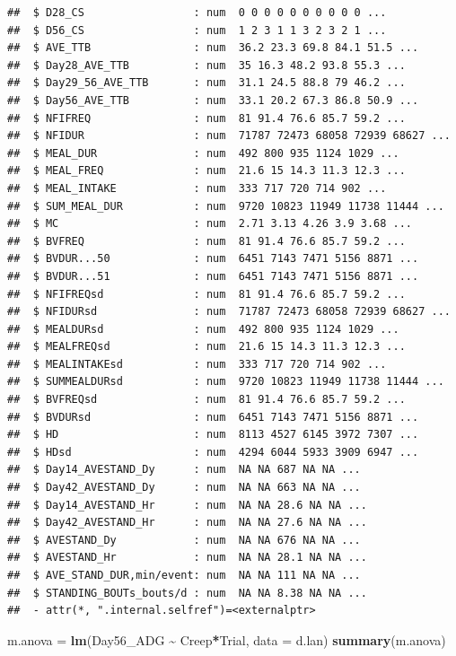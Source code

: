 \documentclass[
]{book}
\newenvironment{Shaded}{\begin{snugshade}}{\end{snugshade}}
\newcommand{\AttributeTok}[1]{\textcolor[rgb]{0.13,0.29,0.53}{#1}}
\newcommand{\FunctionTok}[1]{\textcolor[rgb]{0.13,0.29,0.53}{\textbf{#1}}}
\newcommand{\NormalTok}[1]{#1}
\newcommand{\OtherTok}[1]{\textcolor[rgb]{0.56,0.35,0.01}{#1}}
\newcommand{\SpecialCharTok}[1]{\textcolor[rgb]{0.81,0.36,0.00}{\textbf{#1}}}
\begin{document}
\begin{verbatim}
##  $ D28_CS                 : num  0 0 0 0 0 0 0 0 0 0 ...
##  $ D56_CS                 : num  1 2 3 1 1 3 2 3 2 1 ...
##  $ AVE_TTB                : num  36.2 23.3 69.8 84.1 51.5 ...
##  $ Day28_AVE_TTB          : num  35 16.3 48.2 93.8 55.3 ...
##  $ Day29_56_AVE_TTB       : num  31.1 24.5 88.8 79 46.2 ...
##  $ Day56_AVE_TTB          : num  33.1 20.2 67.3 86.8 50.9 ...
##  $ NFIFREQ                : num  81 91.4 76.6 85.7 59.2 ...
##  $ NFIDUR                 : num  71787 72473 68058 72939 68627 ...
##  $ MEAL_DUR               : num  492 800 935 1124 1029 ...
##  $ MEAL_FREQ              : num  21.6 15 14.3 11.3 12.3 ...
##  $ MEAL_INTAKE            : num  333 717 720 714 902 ...
##  $ SUM_MEAL_DUR           : num  9720 10823 11949 11738 11444 ...
##  $ MC                     : num  2.71 3.13 4.26 3.9 3.68 ...
##  $ BVFREQ                 : num  81 91.4 76.6 85.7 59.2 ...
##  $ BVDUR...50             : num  6451 7143 7471 5156 8871 ...
##  $ BVDUR...51             : num  6451 7143 7471 5156 8871 ...
##  $ NFIFREQsd              : num  81 91.4 76.6 85.7 59.2 ...
##  $ NFIDURsd               : num  71787 72473 68058 72939 68627 ...
##  $ MEALDURsd              : num  492 800 935 1124 1029 ...
##  $ MEALFREQsd             : num  21.6 15 14.3 11.3 12.3 ...
##  $ MEALINTAKEsd           : num  333 717 720 714 902 ...
##  $ SUMMEALDURsd           : num  9720 10823 11949 11738 11444 ...
##  $ BVFREQsd               : num  81 91.4 76.6 85.7 59.2 ...
##  $ BVDURsd                : num  6451 7143 7471 5156 8871 ...
##  $ HD                     : num  8113 4527 6145 3972 7307 ...
##  $ HDsd                   : num  4294 6044 5933 3909 6947 ...
##  $ Day14_AVESTAND_Dy      : num  NA NA 687 NA NA ...
##  $ Day42_AVESTAND_Dy      : num  NA NA 663 NA NA ...
##  $ Day14_AVESTAND_Hr      : num  NA NA 28.6 NA NA ...
##  $ Day42_AVESTAND_Hr      : num  NA NA 27.6 NA NA ...
##  $ AVESTAND_Dy            : num  NA NA 676 NA NA ...
##  $ AVESTAND_Hr            : num  NA NA 28.1 NA NA ...
##  $ AVE_STAND_DUR,min/event: num  NA NA 111 NA NA ...
##  $ STANDING_BOUTs_bouts/d : num  NA NA 8.38 NA NA ...
##  - attr(*, ".internal.selfref")=<externalptr>
\end{verbatim}

\begin{Shaded}
\begin{Highlighting}[]
\NormalTok{m.anova }\OtherTok{=} \FunctionTok{lm}\NormalTok{(Day56\_ADG }\SpecialCharTok{\textasciitilde{}}\NormalTok{ Creep}\SpecialCharTok{*}\NormalTok{Trial, }\AttributeTok{data =}\NormalTok{ d.lan)}
\FunctionTok{summary}\NormalTok{(m.anova)}
\end{Highlighting}
\end{Shaded}
\end{document}
